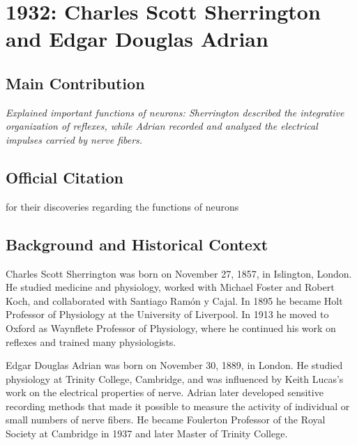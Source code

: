 \chapter[1932 --- Sherrington et al.]{1932: Charles Scott Sherrington and Edgar Douglas Adrian}
\label{ch:1932_Sherrington}

\section*{Main Contribution}

\textit{Explained important functions of neurons: Sherrington described the integrative organization of reflexes, while Adrian recorded and analyzed the electrical impulses carried by nerve fibers.}\cite{nobel-1932,lecture-1932,lecture-adrian-1932}

\section{Official Citation}

for their discoveries regarding the functions of neurons\cite{nobel-1932}

\section{Background and Historical Context}

Charles Scott Sherrington was born on November 27, 1857, in Islington, London. He studied medicine and physiology, worked with Michael Foster and Robert Koch, and collaborated with Santiago Ram{\'o}n y Cajal. In 1895 he became Holt Professor of Physiology at the University of Liverpool. In 1913 he moved to Oxford as Waynflete Professor of Physiology, where he continued his work on reflexes and trained many physiologists.

Edgar Douglas Adrian was born on November 30, 1889, in London. He studied physiology at Trinity College, Cambridge, and was influenced by Keith Lucas's work on the electrical properties of nerve. Adrian later developed sensitive recording methods that made it possible to measure the activity of individual or small numbers of nerve fibers. He became Foulerton Professor of the Royal Society at Cambridge in 1937 and later Master of Trinity College.


